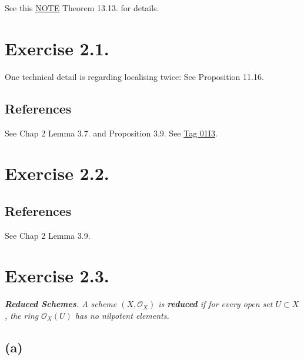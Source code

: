 See this \href{https://math.mit.edu/~mckernan/Teaching/09-10/Autumn/18.725/l_13.pdf}{NOTE} Theorem 13.13. for details.

\section{Exercise 2.1.}\label{Hart Ex 2.1.}

One technical detail is regarding localising twice: See \cite{altman2013term} Proposition 11.16.

\subsection{References}

See \cite{qing2006algebraic} Chap 2 Lemma 3.7. and Proposition 3.9. 
See \href{https://stacks.math.columbia.edu/tag/01I3}{Tag 01I3}.

\section{Exercise 2.2.}

\subsection{References}

See \cite{qing2006algebraic} Chap 2 Lemma 3.9.

\section{Exercise 2.3.}
\textit{\textbf{Reduced Schemes}. A scheme $(X,\mathcal O_X)$ is \textbf{reduced} if for every open set $U\subset X$, the ring $\mathcal O_X(U)$ has no nilpotent elements.}

\subsection{(a)}

